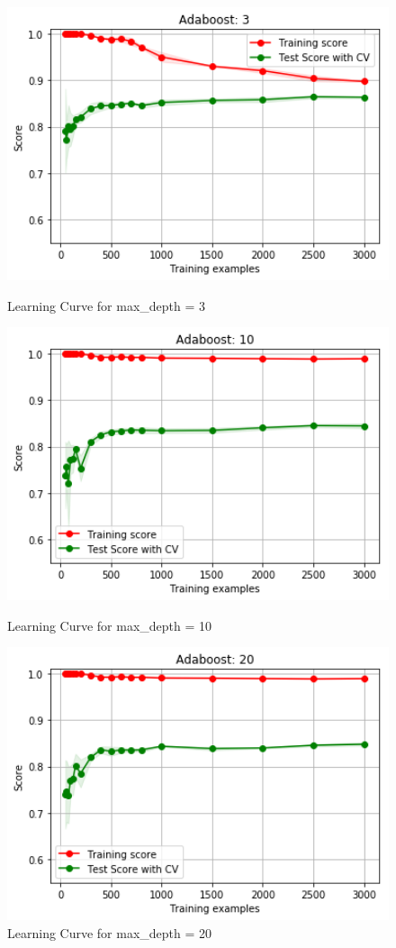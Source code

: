 \documentclass[h]{article}
\begin{document}
\begin{figure}[H]
      \includegraphics[width=1\textwidth,keepaspectratio]{1_curve_boost3.png} 
      \caption*{Learning Curve for max\_depth = 3} 
   \endminipage\hfill
      \includegraphics[width=1\textwidth,keepaspectratio]{1_curve_boost10.png} 
      \caption*{Learning Curve for max\_depth = 10} 
   \endminipage\hfill
      \includegraphics[width=1\textwidth,keepaspectratio]{1_curve_boost20.png} 
      \caption*{Learning Curve for max\_depth = 20} 
   \endminipage\hfill
\end{figure}
\end{document}
